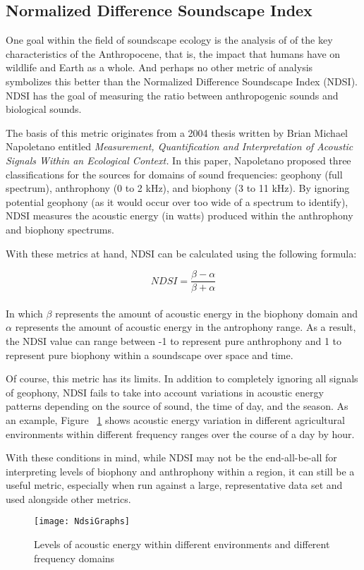 \subsection{Normalized Difference Soundscape Index}
One goal within the field of soundscape ecology is the analysis of of the key characteristics of the Anthropocene, that is, the impact that humans have on wildlife and Earth as a whole. And perhaps no other metric of analysis symbolizes this better than the Normalized Difference Soundscape Index (NDSI). NDSI has the goal of measuring the ratio between anthropogenic sounds and biological sounds.\par
The basis of this metric originates from a 2004 thesis written by Brian Michael Napoletano entitled \textit{Measurement, Quantification and Interpretation of Acoustic Signals Within an Ecological Context.} In this paper, Napoletano proposed three classifications for the sources for domains of sound frequencies: geophony (full spectrum), anthrophony (0 to 2 kHz), and biophony (3 to 11 kHz).\cite{napoletano} By ignoring potential geophony (as it would occur over too wide of a spectrum to identify), NDSI measures the acoustic energy (in watts) produced within the anthrophony and biophony spectrums.\par
With these metrics at hand, NDSI can be calculated using the following formula:\par

\begin{equation}
  NDSI = \frac{\beta - \alpha}{\beta + \alpha}
\end{equation} \\[-24pt]

In which \(\beta\) represents the amount of acoustic energy in the biophony domain and \(\alpha\) represents the amount of acoustic energy in the antrophony range. As a result, the NDSI value can range between -1 to represent pure anthrophony and 1 to represent pure biophony within a soundscape over space and time.\cite{gage}\par
Of course, this metric has its limits. In addition to completely ignoring all signals of geophony, NDSI fails to take into account variations in acoustic energy patterns depending on the source of sound, the time of day, and the season. As an example, Figure ~\ref{fig:ndsiGraphs} shows acoustic energy variation in different agricultural environments within different frequency ranges over the course of a day by hour.\par
With these conditions in mind, while NDSI may not be the end-all-be-all for interpreting levels of biophony and anthrophony within a region, it can still be a useful metric, especially when run against a large, representative data set and used alongside other metrics.\par

\begin{figure}
  \begin{center}
    \texttt{[image: NdsiGraphs]}
  \end{center}
  \caption{Levels of acoustic energy within different environments and different frequency domains}
  \label{fig:ndsiGraphs}
\end{figure}
